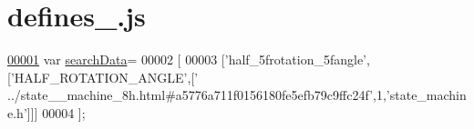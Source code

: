 \hypertarget{defines__6_8js_source}{}\section{defines\+\_.\+js}
\label{defines__6_8js_source}

\begin{DoxyCode}
\hypertarget{defines__6_8js_source.tex_l00001}{}\hyperlink{defines__6_8js_ad01a7523f103d6242ef9b0451861231e}{00001} var \hyperlink{defines__6_8js_ad01a7523f103d6242ef9b0451861231e}{searchData}=
00002 [
00003   [\textcolor{stringliteral}{'half\_5frotation\_5fangle'},[\textcolor{stringliteral}{'HALF\_ROTATION\_ANGLE'},[\textcolor{stringliteral}{'
      ../state\_\_machine\_8h.html#a5776a711f0156180fe5efb79c9ffc24f'},1,\textcolor{stringliteral}{'state\_machine.h'}]]]
00004 ];
\end{DoxyCode}
